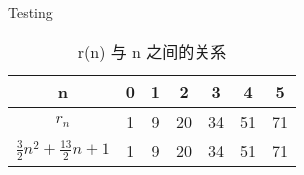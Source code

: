 \documentclass[mode=geye]{elegantnote}
\begin{document}
Testing
\begin{table}[htbp]
	\centering
	\small
	\caption{r(n) 与 n 之间的关系}
	\begin{tabular}{c|ccc ccc}
		\toprule
		n & 0 & 1 & 2 & 3 & 4 & 5 \\  
		\midrule
		$ r_n $ & 1 & 9 & 20 & 34 & 51 & 71\\
        $ \frac{3}{2}n^2+\frac{13}{2}n+1 $ & 1 & 9 & 20 & 34 & 51 & 71\\
		\bottomrule
	\end{tabular}%
	\label{tab:rnCompare}%
\end{table}%
\end{document}
